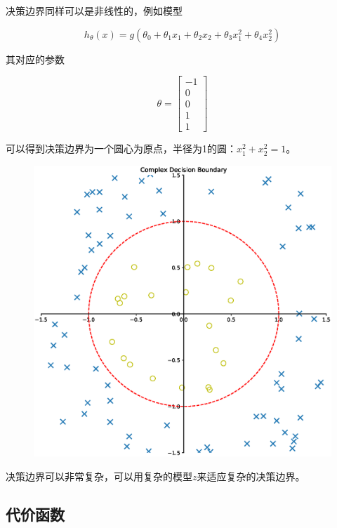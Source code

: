 \documentclass[12pt, a4paper]{article}
\begin{document}
决策边界同样可以是非线性的，例如模型

\begin{equation*}
    h_\theta(x)=g(\theta_0+\theta_1x_1+\theta_2x_2+\theta_3x_1^2+\theta_4x_2^2)
\end{equation*}

其对应的参数

\begin{equation*}
    \theta=
    \begin{bmatrix}
        -1 \\
        0  \\
        0  \\
        1  \\
        1
    \end{bmatrix}
\end{equation*}

可以得到决策边界为一个圆心为原点，半径为1的圆：$x_1^2+x_2^2=1$。

\begin{figure}[H]
    \includegraphics[width=1\textwidth]{ComplexDecisionBoundary.eps}
\end{figure}

决策边界可以非常复杂，可以用复杂的模型$z$来适应复杂的决策边界。

\subsection{代价函数}
\end{document}
